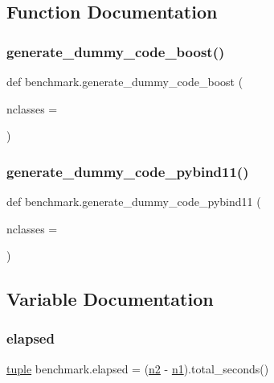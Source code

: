 \subsection{Function Documentation}
\mbox{\label{namespacebenchmark_a714bbeed8f2f2b196b7ef86e3d37f312}} 
\subsubsection{\texorpdfstring{generate\_dummy\_code\_boost()}{generate\_dummy\_code\_boost()}}
{\footnotesize\ttfamily def benchmark.\+generate\+\_\+dummy\+\_\+code\+\_\+boost (\begin{DoxyParamCaption}\item[{}]{nclasses = {} }\end{DoxyParamCaption})}

\mbox{\label{namespacebenchmark_a5359521e823a327e1afc7a83d99fa73e}} 
\subsubsection{\texorpdfstring{generate\_dummy\_code\_pybind11()}{generate\_dummy\_code\_pybind11()}}
{\footnotesize\ttfamily def benchmark.\+generate\+\_\+dummy\+\_\+code\+\_\+pybind11 (\begin{DoxyParamCaption}\item[{}]{nclasses = {} }\end{DoxyParamCaption})}



\subsection{Variable Documentation}
\mbox{\label{namespacebenchmark_aa84b82587deca84da9db059c28668891}} 
\subsubsection{\texorpdfstring{elapsed}{elapsed}}
{\footnotesize\ttfamily \mbox{\hyperlink{classtuple}{tuple}} benchmark.\+elapsed = (\mbox{\hyperlink{namespacebenchmark_a5a772e99afcb2da6f2ca2237dbb48840}{n2}} -\/ \mbox{\hyperlink{namespacebenchmark_a6fb7f885fb53a5264b524e52be7c7fed}{n1}}).total\+\_\+seconds()}

